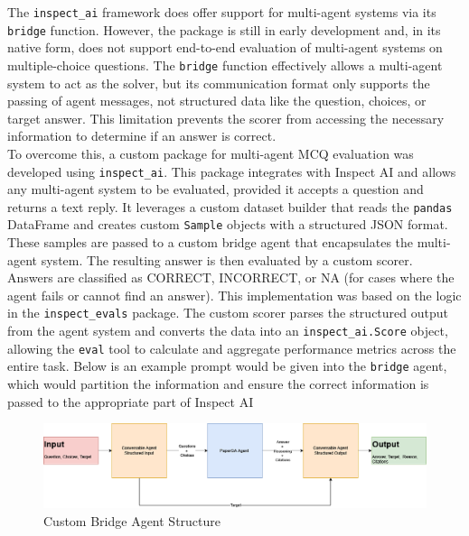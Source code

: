 The \texttt{inspect\_ai} framework does offer support for multi-agent systems via its \texttt{bridge} function. However, the package is still in early development and, in its native form, does not support end-to-end evaluation of multi-agent systems on multiple-choice questions. The \texttt{bridge} function effectively allows a multi-agent system to act as the solver, but its communication format only supports the passing of agent messages, not structured data like the question, choices, or target answer. 
This limitation prevents the scorer from accessing the necessary information to determine if an answer is correct. \\

To overcome this, a custom package for multi-agent MCQ evaluation was developed using \texttt{inspect\_ai}. This package integrates with Inspect AI and allows any multi-agent system to be evaluated, provided it accepts a question and returns a text reply. 
It leverages a custom dataset builder that reads the \texttt{pandas} DataFrame and creates custom \texttt{Sample} objects with a structured JSON format. These samples are passed to a custom bridge agent that encapsulates the multi-agent system. The resulting answer is then evaluated by a custom scorer. Answers are classified as CORRECT, INCORRECT, or NA (for cases where the agent fails or cannot find an answer). This implementation was based on the logic in the \texttt{inspect\_evals} package. The custom scorer parses the structured output from the agent system and converts the data into an \texttt{inspect\_ai.Score} object, allowing the \texttt{eval} tool to calculate and aggregate performance metrics across the entire task. Below is an example prompt would be given into the \texttt{bridge} agent, which would partition the information and ensure the correct information is passed to the appropriate part of Inspect AI\\

\begin{figure}[H]
    \centering
    \includegraphics[width=\textwidth]{figures/bridge_agent.png}
    \caption{Custom Bridge Agent Structure}
    \label{fig:bridge_agent}
\end{figure}


